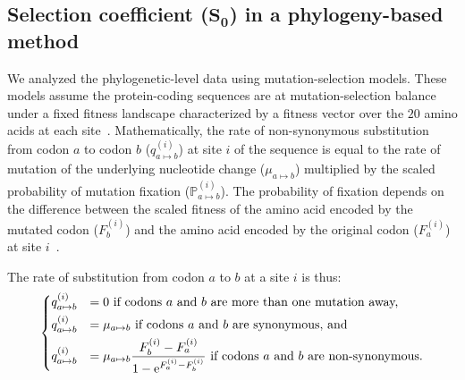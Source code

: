 \documentclass[10pt,letterpaper]{article}
\newcommand{\e}{\text{e}}
\newcommand{\proba}{\mathbb{P}}
\newcommand{\Sphy}{S_{0}}
\begin{document}
\subsection{Selection coefficient (\texorpdfstring{$\bm{\Sphy}$}{S₀}) in a phylogeny-based method}
\label{subsec:s-phylogeny-method}

We analyzed the phylogenetic-level data using mutation-selection models.
These models assume the protein-coding sequences are at mutation-selection balance under a fixed fitness landscape characterized by a fitness vector over the $20$ amino acids at each site~\cite{yang_mutationselection_2008, halpern_evolutionary_1998, rodrigue_mechanistic_2010}.
Mathematically, the rate of non-synonymous substitution from codon $a$ to codon $b$ ($q_{a \mapsto b}^{(i)}$) at site $i$ of the sequence is equal to the rate of mutation of the underlying nucleotide change ($\mu_{a \mapsto b}$) multiplied by the scaled probability of mutation fixation ($\proba_{a \mapsto b}^{(i)}$).
The probability of fixation depends on the difference between the scaled fitness of the amino acid encoded by the mutated codon ($F_b^{(i)}$) and the amino acid encoded by the original codon ($F_a^{(i)}$) at site $i$~\cite{wright_evolution_1931, fisher_genetical_1930}.

The rate of substitution from codon $a$ to $b$ at a site $i$ is thus:
\begin{equation}
\begin{dcases}
q_{a \mapsto b}^{(i)} & = 0 \text{ if codons $a$ and $b$ are more than one mutation away,} \\
q_{a \mapsto b}^{(i)} & = \mu_{a \mapsto b} \text{ if codons $a$ and $b$ are synonymous, and}\\
q_{a \mapsto b}^{(i)} & = \mu_{a \mapsto b} \dfrac{F_b^{(i)} - F_a^{(i)}}{1 - \e^{F_a^{(i)} - F_b^{(i)}}} \text{ if codons $a$ and $b$ are non-synonymous}.
\end{dcases}\label{eq:subs}
\end{equation}
\end{document}
